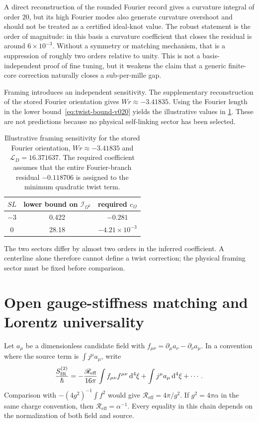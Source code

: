 \documentclass[aps,pre,preprint,notitlepage,nofootinbib,superscriptaddress]{revtex4-2}
\newcommand{\dd}{\mathrm d}
\newcommand{\calL}{\mathcal L}
\newcommand{\calI}{\mathcal I}
\newcommand{\Reff}{\mathscr R_{\mathrm{eff}}}
\begin{document}
A direct reconstruction of the rounded Fourier record gives a curvature integral of order $20$, but its high Fourier modes also generate curvature overshoot and should not be treated as a certified ideal-knot value.  The robust statement is the order of magnitude: in this basis a curvature coefficient that closes the residual is around $6\times10^{-3}$.  Without a symmetry or matching mechanism, that is a suppression of roughly two orders relative to unity.  This is not a basis-independent proof of fine tuning, but it weakens the claim that a generic finite-core correction naturally closes a sub-per-mille gap.

Framing introduces an independent sensitivity.  The supplementary reconstruction of the stored Fourier orientation gives $Wr\approx-3.41835$.  Using the Fourier length in the lower bound~\eqref{eq:twist-bound-v020} yields the illustrative values in \cref{tab:framing-sensitivity}.  These are not predictions because no physical self-linking sector has been selected.

\begin{table}[t]
\caption{Illustrative framing sensitivity for the stored Fourier orientation, $Wr\approx-3.41835$ and $\calL_D=16.371637$.  The required coefficient assumes that the entire Fourier-branch residual $-0.118706$ is assigned to the minimum quadratic twist term.}
\label{tab:framing-sensitivity}
\begin{ruledtabular}
\begin{tabular}{ccc}
$SL$ & lower bound on $\calI_{\Omega^2}$ & required $c_\Omega$\\
\hline
$-3$ & 0.422 & $-0.281$\\
$0$  & 28.18 & $-4.21\times10^{-3}$\\
\end{tabular}
\end{ruledtabular}
\end{table}

The two sectors differ by almost two orders in the inferred coefficient.  A centerline alone therefore cannot define a twist correction; the physical framing sector must be fixed before comparison.

\section{Open gauge-stiffness matching and Lorentz universality}
\label{sec:gauge}

Let $a_\mu$ be a dimensionless candidate field with $f_{\mu\nu}=\partial_\mu a_\nu-\partial_\nu a_\mu$.  In a convention where the source term is $\int j^\mu a_\mu$, write
\begin{equation}
  \frac{S_{\rm IR}^{(2)}}{\hbar}
  =-\frac{\Reff}{16\pi}\int f_{\mu\nu}f^{\mu\nu}\,\dd^4\xi
   +\int j^\mu a_\mu\,\dd^4\xi+\cdots.
\end{equation}
Comparison with $-(4g^2)^{-1}\int f^2$ would give $\Reff=4\pi/g^2$.  If $g^2=4\pi\alpha$ in the same charge convention, then $\Reff=\alpha^{-1}$.  Every equality in this chain depends on the normalization of both field and source.
\end{document}
